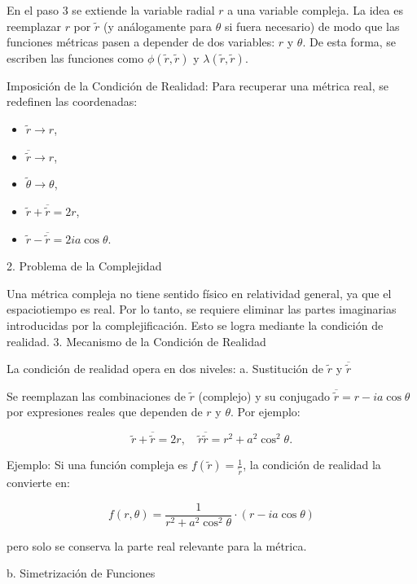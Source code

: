 \begin{enumerate}[1]
          En el paso 3 se extiende la variable radial $r$ a una variable compleja. La idea es reemplazar $r$ por $\tilde{r}$ (y análogamente para $\theta$ si fuera necesario) de modo que las funciones métricas pasen a depender de dos variables: $r$ y $\theta$. De esta forma, se escriben las funciones como $\phi(\tilde{r}, \tilde{r})$ y $\lambda(\tilde{r}, \tilde{r})$.
        \begin{note}
        Imposición de la Condición de Realidad:  
        Para recuperar una métrica real, se redefinen las coordenadas:  
        \begin{itemize}
            \item $\tilde{r} \rightarrow r$,  
            \item $\overline{\tilde{r}} \rightarrow r$,  
            \item $\tilde{\theta} \rightarrow \theta$,  
            \item $\tilde{r}+\overline{\tilde{r}}=2 r$,  
            \item $\tilde{r}-\overline{\tilde{r}}=2 i a \cos \theta$.  
        \end{itemize}      
    \end{note}


    2. Problema de la Complejidad

Una métrica compleja no tiene sentido físico en relatividad general, ya que el espaciotiempo es real. Por lo tanto, se requiere eliminar las partes imaginarias introducidas por la complejificación. Esto se logra mediante la condición de realidad.
3. Mecanismo de la Condición de Realidad

La condición de realidad opera en dos niveles:
a. Sustitución de $\tilde{r}$ y $\overline{\tilde{r}}$

Se reemplazan las combinaciones de $\tilde{r}$ (complejo) y su conjugado $\overline{\tilde{r}}=r-i a \cos \theta$ por expresiones reales que dependen de $r$ y $\theta$. Por ejemplo:

$$
\tilde{r}+\overline{\tilde{r}}=2 r, \quad \tilde{r} \overline{\tilde{r}}=r^2+a^2 \cos ^2 \theta .
$$


Ejemplo:
Si una función compleja es $f(\tilde{r})=\frac{1}{\tilde{r}}$, la condición de realidad la convierte en:

$$
f(r, \theta)=\frac{1}{r^2+a^2 \cos ^2 \theta} \cdot(r-i a \cos \theta)
$$

pero solo se conserva la parte real relevante para la métrica.

b. Simetrización de Funciones


\end{enumerate}
